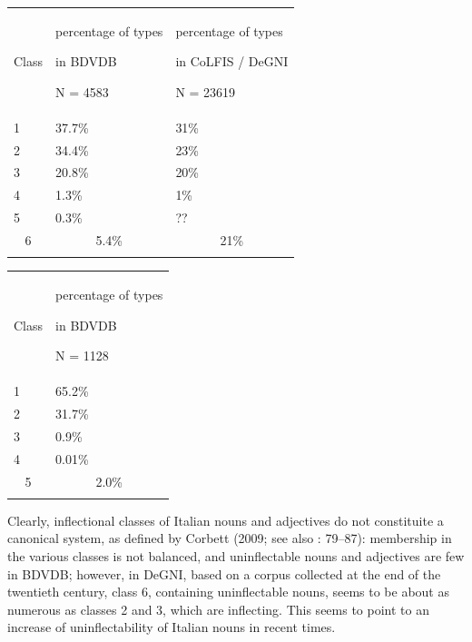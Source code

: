 \documentclass[output=paper]{langscibook}
\begin{document}
\begin{tabularx}{\textwidth}{XXX}

\lsptoprule

Class & percentage of types

in BDVDB

N = 4583 & percentage of types

in CoLFIS / DeGNI

N = 23619\\
1 & 37.7\% & 31\%\\
2 & 34.4\% & 23\%\\
3 & 20.8\% & 20\%\\
4 & 1.3\% & 1\%\\
5 & 0.3\% & ??\\
\multicolumn{1}{c}{6} & \multicolumn{1}{c}{5.4\%} & \multicolumn{1}{c}{21\%}\\
\lspbottomrule
\end{tabularx}
\begin{table}
\caption{Percentage of adjectives in each inflectional class (types)}
\label{tab:key:6}
\end{table}


\begin{tabularx}{\textwidth}{XX}

\lsptoprule

Class & percentage of types

in BDVDB

N = 1128\\
1 & 65.2\%\\
2 & 31.7\%\\
3 & 0.9\%\\
4 & 0.01\%\\
\multicolumn{1}{c}{5} & \multicolumn{1}{c}{2.0\%}\\
\lspbottomrule
\end{tabularx}
Clearly, inflectional classes of Italian nouns and adjectives do not constituite a canonical system, as defined by Corbett (2009; see also \citealt{Thornton2019}: 79–87): membership in the various classes is not balanced, and uninflectable nouns and adjectives are few in BDVDB; however, in DeGNI, based on a corpus collected at the end of the twentieth century, class 6, containing uninflectable nouns, seems to be about as numerous as classes 2 and 3, which are inflecting. This seems to point to an increase of uninflectability of Italian nouns in recent times. 
\end{document}
